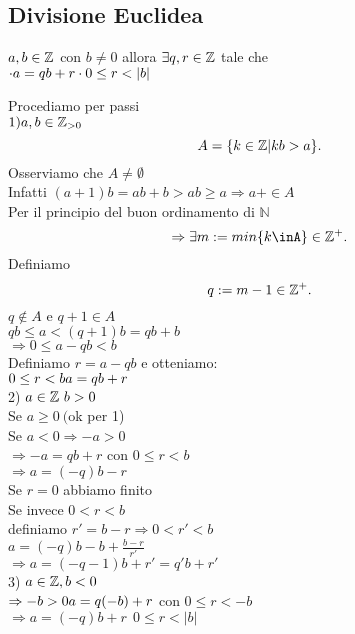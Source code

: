 \documentclass[12px]{article}
\begin{document}
\subsection{Divisione Euclidea}
	\begin{teo}
		$a,b\in\mathbb{Z}$ con  $b\neq 0$ allora $\exists q,r\in \mathbb{Z}$ tale che \\
		$	\cdot a = qb+r\\
			\cdot 0\leq r< |b|$
	\end{teo}
	\begin{dimo}
		Procediamo per passi\\
		$1) a,b\in \mathbb{Z}_{>0}$
		 \[
			 A = \{k\in\mathbb{Z} | kb>a\}
		.\] 
		Osserviamo che $A\neq \emptyset$\\
		Infatti  $(a+1)b=ab+b>ab\geq a \Rightarrow a + \in A$ \\
		Per il principio del buon ordinamento di $\mathbb N$
		 \[
		 \Rightarrow \exists m := min\{k\inA\}\in\Z^+
		.\] 
		Definiamo 
		\[
		q:=m-1\in \mathbb{Z}^+
		.\] 
		$q\not\in A$ e $q+1\in A$\\
		 $qb\leq a < (q+1)b=qb + b$ \\
		 $ \Rightarrow 0\leq a - qb < b$ \\
		 Definiamo $r = a - qb$ e otteniamo:\\
		  $0\leq r < b\\
		  a = qb + r$\\
		  2)  $a\in\mathbb{Z}\ b > 0$\\
		  Se  $a\geq 0 \ ($ok per 1)\\
		  Se  $a < 0 \Rightarrow - a > 0$ \\
		  $ \Rightarrow -a = qb + r$ con $0\leq r< b$\\
		   $ \Rightarrow a = (-q)b - r$ \\
		   Se $r = 0$ abbiamo finito \\
		   Se invece $0 < r < b$\\
		   definiamo  $r' = b-r \Rightarrow 0 < r' < b$ \\
		   $a = (-q)b - b + \frac{b-r}{r'}$\\
		    $ \Rightarrow a = (-q-1)b + r' = q'b + r'$\\
		    3) $a\in\mathbb{Z}, b < 0$\\
		     $ \Rightarrow -b > 0\\
		     a = q(-b) + r$ con $0\leq r<-b$\\
		      $ \Rightarrow a = (-q)b + r \ \ 0\leq r < |b|$
	\end{dimo}
	\newpage
\end{document}

